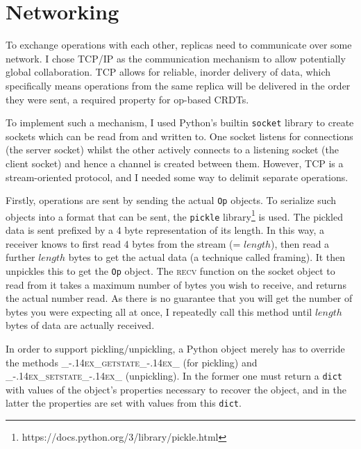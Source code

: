 \documentclass[diss.tex]{subfiles}
\begin{document}



\section{Networking}\label{sec:networking}
To exchange operations with each other, replicas need to communicate over some network. I chose TCP/IP as the communication mechanism to allow potentially global collaboration. TCP allows for reliable, inorder delivery of data, which specifically means operations from the same replica will be delivered in the order they were sent, a required property for op-based CRDTs. 

To implement such a mechanism, I used Python's builtin \texttt{socket} library to create sockets which can be read from and written to. One socket listens for connections (the server socket) whilst the other actively connects to a listening socket (the client socket) and hence a channel is created between them. However, TCP is a stream-oriented protocol, and I needed some way to delimit separate operations.

Firstly, operations are sent by sending the actual \texttt{Op} objects. To serialize such objects into a format that can be sent, the \texttt{pickle} library\footnote{https://docs.python.org/3/library/pickle.html} is used. The pickled data is sent prefixed by a 4 byte representation of its length. In this way, a receiver knows to first read 4 bytes from the stream (= $length$), then read a further $length$ bytes to get the actual data (a technique called framing). It then unpickles this to get the \texttt{Op} object. The \textsc{recv} function on the socket object to read from it takes a maximum number of bytes you wish to receive, and returns the actual number read. As there is no guarantee that you will get the number of bytes you were expecting all at once, I repeatedly call this method until $length$ bytes of data are actually received.

In order to support pickling/unpickling, a Python object merely has to override the methods \textsc{\_\kern-.14ex\_getstate\_\kern-.14ex\_} (for pickling) and \textsc{\_\kern-.14ex\_setstate\_\kern-.14ex\_} (unpickling). In the former one must return a \texttt{dict} with values of the object's properties necessary to recover the object, and in the latter the properties are set with values from this \texttt{dict}.
\end{document}
